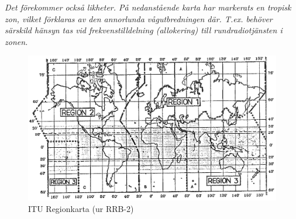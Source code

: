 \emph{Det förekommer också likheter.
  På nedanstående karta har markerats en tropisk zon, vilket förklaras av den
  annorlunda vågutbredningen där.
  T.ex. behöver särskild hänsyn tas vid frekvenstilldelning (allokering) till
  rundradiotjänsten i zonen.}

\begin{figure}
  \includegraphics[width=\textwidth]{images/cropped_pdfs/bild_3_2-01.pdf}
  \caption{ITU Regionkarta (ur RRB-2)}
  \label{fig:bildIII2-1}
\end{figure}
